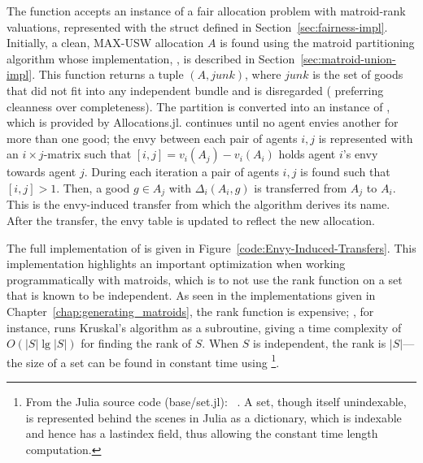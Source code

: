 The function accepts an instance of a fair allocation problem with matroid-rank valuations, represented with the  struct defined in Section~\ref{sec:fairness-impl}. Initially, a clean, MAX-USW allocation $A$ is found using the matroid partitioning algorithm whose implementation, , is described in Section~\ref{sec:matroid-union-impl}. This function returns a tuple $(A, junk)$, where $junk$ is the set of goods that did not fit into any independent bundle and is disregarded ( preferring cleanness over completeness). The partition is converted into an instance of , which is provided by Allocations.jl.  continues until no agent envies another for more than one good; the envy between each pair of agents $i,j$ is represented with an $i\times j$-matrix  such that $[i,j] = v_i(A_j) - v_i(A_i)$ holds agent $i$'s envy towards agent $j$. During each iteration a pair of agents $i,j$ is found such that $[i,j] > 1$. Then, a good $g\in A_j$ with $\Delta_i(A_i, g)$ is transferred from $A_j$ to $A_i$. This is the envy-induced transfer from which the algorithm derives its name. After the transfer, the envy table is updated to reflect the new allocation.

The full implementation of  is given in Figure~\ref{code:Envy-Induced-Transfers}. This implementation highlights an important optimization when working programmatically with matroids, which is to not use the rank function on a set that is known to be independent. As seen in the implementations given in Chapter~\ref{chap:generating_matroids}, the rank function is expensive; , for instance, runs Kruskal's algorithm as a subroutine, giving a time complexity of $O(|S|\lg{|S|})$ for finding the rank of $S$. When $S$ is independent, the rank is $|S|$---the size of a set can be found in constant time using \footnote{From the Julia source code (base/set.jl): ~\cite{bezanson2017julia}. A set, though itself unindexable, is represented behind the scenes in Julia as a dictionary, which is indexable and hence has a lastindex field, thus allowing the constant time length computation.}.

